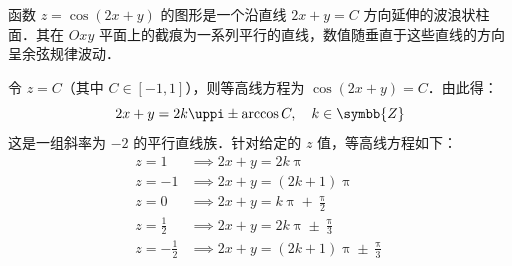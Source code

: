 \begin{solution}
    函数 $z = \cos(2x + y)$ 的图形是一个沿直线 $2x + y = C$ 方向延伸的波浪状柱面．其在 $Oxy$ 平面上的截痕为一系列平行的直线，数值随垂直于这些直线的方向呈余弦规律波动．

    \begin{center}
    \end{center}

    令 $z = C$（其中 $C \in [-1, 1]$），则等高线方程为 $\cos(2x + y) = C$．由此得：
    \begin{equation}
        2x + y = 2k\uppi \pm \arccos C, \quad k \in \symbb{Z}
    \end{equation}
    这是一组斜率为 $-2$ 的平行直线族．针对给定的 $z$ 值，等高线方程如下：
    \begin{equation}
        \begin{aligned}
            z = 1            & \implies 2x + y = 2k\uppi                         \\
            z = -1           & \implies 2x + y = (2k+1)\uppi                     \\
            z = 0            & \implies 2x + y = k\uppi + \frac{\uppi}{2}        \\
            z = \frac{1}{2}  & \implies 2x + y = 2k\uppi \pm \frac{\uppi}{3}     \\
            z = -\frac{1}{2} & \implies 2x + y = (2k+1)\uppi \pm \frac{\uppi}{3}
        \end{aligned}
    \end{equation}


\end{solution}
